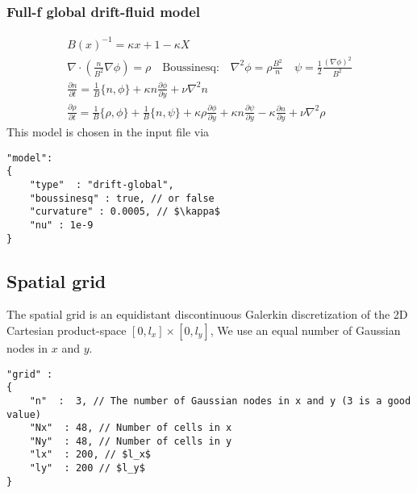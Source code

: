 \subsubsection{Full-f global drift-fluid model}
\begin{subequations}
\begin{align}
B(x)^{-1} = \kappa x +1-\kappa X\\
 \nabla \cdot \left(\frac{n}{B^2} \nabla \phi\right) = \rho \quad
 \text{Boussinesq:}\quad \nabla^2\phi = \rho \frac{B^2}{n} \quad
\psi = \frac{1}{2} \frac{(\nabla\phi)^2}{B^2}\\
 \frac{\partial n}{\partial t}     =
    \frac{1}{B}\{ n, \phi\}
  + \kappa n\frac{\partial \phi}{\partial y}
  + \nu \nabla^2 n  \\
  \frac{\partial \rho}{\partial t} =
  \frac{1}{B}\{ \rho, \phi\}
  + \frac{1}{B}\{n, \psi\}
  + \kappa \rho\frac{\partial \phi}{\partial y}
  + \kappa n\frac{\partial \psi}{\partial y}
  - \kappa\frac{\partial n}{\partial y} +\nu\nabla^2\rho 
\end{align}
\end{subequations}
This model is chosen in the input file via
\begin{verbatim}
"model":
{
    "type"  : "drift-global",
    "boussinesq" : true, // or false
    "curvature" : 0.0005, // $\kappa$
    "nu" : 1e-9
}
\end{verbatim}
\subsection{Spatial grid} \label{sec:spatial}
The spatial grid is an equidistant discontinuous Galerkin discretization of the
2D Cartesian product-space
$[ 0, l_x]\times [0, l_y]$,
We use an equal number of Gaussian nodes in $x$ and $y$.
\begin{verbatim}
"grid" :
{
    "n"  :  3, // The number of Gaussian nodes in x and y (3 is a good value)
    "Nx"  : 48, // Number of cells in x
    "Ny"  : 48, // Number of cells in y
    "lx"  : 200, // $l_x$
    "ly"  : 200 // $l_y$
}
\end{verbatim}



